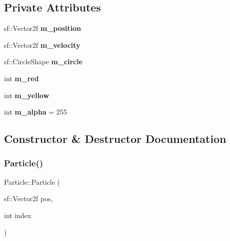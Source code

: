 \subsection*{Private Attributes}
\begin{DoxyCompactItemize}
\item 
\mbox{\label{class_particle_a4581cc1d476f359066a4fd67c42260e2}} 
sf\+::\+Vector2f {\bfseries m\+\_\+position}
\item 
\mbox{\label{class_particle_ad6674fcfaa43b503906348bec1fd6201}} 
sf\+::\+Vector2f {\bfseries m\+\_\+velocity}
\item 
\mbox{\label{class_particle_a73370ae6ce66c7533749838b4ebd1a25}} 
sf\+::\+Circle\+Shape {\bfseries m\+\_\+circle}
\item 
\mbox{\label{class_particle_a3cc888443a8e1cddcb266a186e0d137f}} 
int {\bfseries m\+\_\+red}
\item 
\mbox{\label{class_particle_a17759475ebaf2a86130e80d8f1b6b7c5}} 
int {\bfseries m\+\_\+yellow}
\item 
\mbox{\label{class_particle_adfe049809a2b7e08ee4c915ad40a716e}} 
int {\bfseries m\+\_\+alpha} = 255
\end{DoxyCompactItemize}


\subsection{Constructor \& Destructor Documentation}
\mbox{\label{class_particle_a33755d4e470cf8e91f7aa224d48effb4}} 
\subsubsection{\texorpdfstring{Particle()}{Particle()}}
{\footnotesize\ttfamily Particle\+::\+Particle (\begin{DoxyParamCaption}\item[{sf\+::\+Vector2f}]{pos,  }\item[{int}]{index }\end{DoxyParamCaption})}



